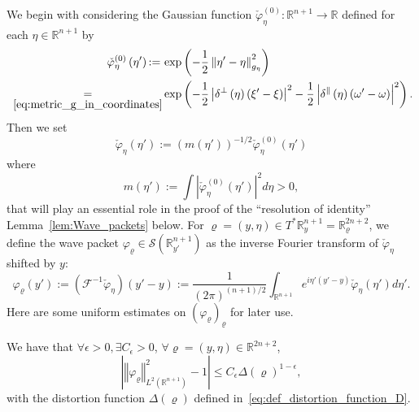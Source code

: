 \documentclass[AHL,Unicode,longabstracts,published]{cedram}
\newcommand{\clS}{\mathcal{S}}
\newcommand{\clF}{\mathcal{F}}
\newcommand{\bbR}{\mathbb{R}}
\let\oldexists\exists
\renewcommand*{\exists}{\mathrel{\oldexists}}
\let\oldforall\forall
\renewcommand*{\forall}{\mathrel{\oldforall}}
\newcommand{\bbR}{\mathbb{R}}
\begin{document}
We begin with considering the Gaussian function $\check{\varphi}_{\eta}^{(0)}:\bbR^{n+1}\to\bbR$ defined for each $\eta\in\bbR^{n+1}$ by
\begin{equation}\label{eq:def_phi_0}
\begin{split}
\check{\varphi}_{\eta}^{\left(0\right)}\left(\eta'\right){:=}\,& \exp\left(-\frac{1}{2}\left\Vert \eta'-\eta\right\Vert _{g_{\eta}}^{2}\right) \\
 \;\underset{\eqref{eq:metric_g_in_coordinates}}{=}&\exp\left(-\frac{1}{2}\left|\delta^{\perp}\left(\eta\right)\left(\xi'-\xi\right)\right|^{2}-\frac{1}{2}\left|\delta^{\parallel}\left(\eta\right)\left(\omega'-\omega\right)\right|^{2}\right).
\end{split}
\end{equation}
Then we set
\begin{equation}\label{eq:def_phi_xi}
\check{\varphi}_{\eta}\left(\eta'\right):=\left(m\left(\eta'\right)\right)^{-1/2}\check{\varphi}_{\eta}^{\left(0\right)}\left(\eta'\right)
\end{equation}
where
\begin{equation}\label{eq:def_m}
m\left(\eta'\right):=\int\left|\check{\varphi}_{\eta}^{\left(0\right)}\left(\eta'\right)\right|^{2}d\eta>0,
\end{equation}
that will play an essential role in the proof of the ``resolution of identity'' Lemma~\ref{lem:Wave_packets} below. For $\varrho=(y,\eta)\in T^{*}\bbR_{y}^{n+1}=\bbR_{\varrho}^{2n+2}$, we define the wave packet $\varphi_{\varrho}\in\clS(\bbR_{y'}^{n+1})$ as the inverse Fourier transform of $\check{\varphi}_{\eta}$ shifted by $y$:
\begin{equation}\label{eq:wave_packet}
\varphi_{\varrho}\left(y'\right) := \left(\clF^{-1}\check{\varphi}_{\eta}\right)\left(y'-y\right):=\frac{1}{\left(2\pi\right)^{\left(n+1\right)/2}}\int_{\bbR^{n+1}}e^{i\eta'\left(y'-y\right)}\check{\varphi}_{\eta}\left(\eta'\right)d\eta'.
\end{equation}
Here are some uniform estimates on $(\varphi_{\varrho})_{\varrho}$ for later use.

\begin{cBoxB}{}
\begin{lemm}\label{lem:norm_wave_packets}
We have that $\forall\epsilon>0,\exists C_{\epsilon}>0$, $\forall\varrho=(y,\eta)\in\bbR^{2n+2}$,
\begin{equation}
\left|\left\Vert \varphi_{\varrho}\right\Vert _{L^{2}\left(\bbR^{n+1}\right)}^{2}-1\right|\leq C_{\epsilon}\Delta\left(\varrho\right)^{1-\epsilon},\label{eq:norme_wave_packet}
\end{equation}
with the distortion function $\Delta(\varrho)$ defined in~\eqref{eq:def_distortion_function_D}.
\end{lemm}
\end{cBoxB}
\end{document}
